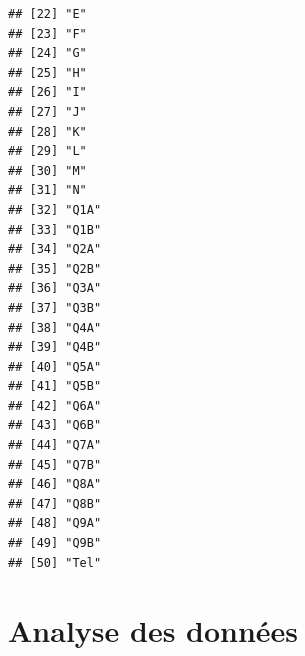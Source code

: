 \documentclass[12pt,english,french]{article}\usepackage{graphicx, color}
\makeatletter
\newenvironment{kframe}{%
 \def\at@end@of@kframe{}%
 \ifinner\ifhmode%
  \def\at@end@of@kframe{\end{minipage}}%
  \begin{minipage}{\columnwidth}%
 \fi\fi%
 \def\FrameCommand##1{\hskip\@totalleftmargin \hskip-\fboxsep
 \colorbox{shadecolor}{##1}\hskip-\fboxsep
     \hskip-\linewidth \hskip-\@totalleftmargin \hskip\columnwidth}%
 \MakeFramed {\advance\hsize-\width
   \@totalleftmargin\z@ \linewidth\hsize
   \@setminipage}}%
 {\par\unskip\endMakeFramed%
 \at@end@of@kframe}
\newenvironment{knitrout}{}{} %
\makeatother
\begin{document}
\begin{knitrout}
\begin{kframe}
\begin{verbatim}
## [22] "E"                                                                  
## [23] "F"                                                                  
## [24] "G"                                                                  
## [25] "H"                                                                  
## [26] "I"                                                                  
## [27] "J"                                                                  
## [28] "K"                                                                  
## [29] "L"                                                                  
## [30] "M"                                                                  
## [31] "N"                                                                  
## [32] "Q1A"                                                                
## [33] "Q1B"                                                                
## [34] "Q2A"                                                                
## [35] "Q2B"                                                                
## [36] "Q3A"                                                                
## [37] "Q3B"                                                                
## [38] "Q4A"                                                                
## [39] "Q4B"                                                                
## [40] "Q5A"                                                                
## [41] "Q5B"                                                                
## [42] "Q6A"                                                                
## [43] "Q6B"                                                                
## [44] "Q7A"                                                                
## [45] "Q7B"                                                                
## [46] "Q8A"                                                                
## [47] "Q8B"                                                                
## [48] "Q9A"                                                                
## [49] "Q9B"                                                                
## [50] "Tel"
\end{verbatim}
\end{kframe}
\end{knitrout}


\section{Analyse des données}
\end{document}
